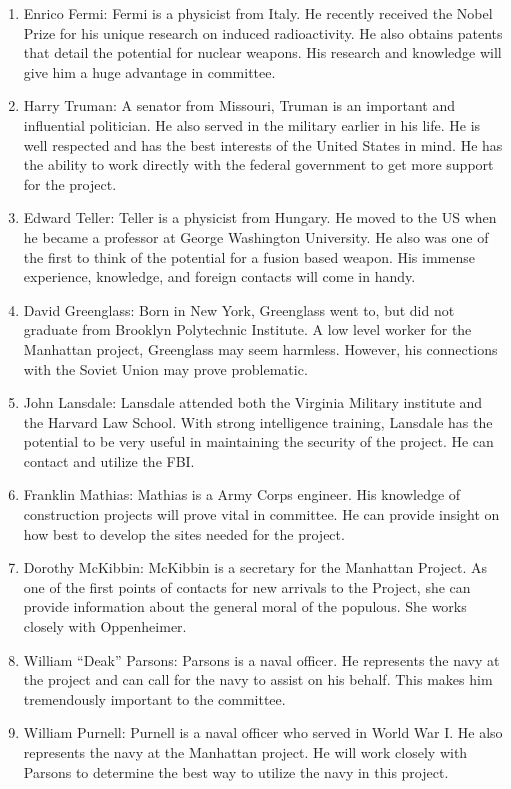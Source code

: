 \documentclass[11 pt, twoside]{article}
\begin{document}
\begin{enumerate}
\item Enrico Fermi: Fermi is a physicist from Italy. He recently received the Nobel Prize for his unique research on induced radioactivity. He also obtains patents that detail the potential for nuclear weapons. His research and knowledge will give him a huge advantage in committee.  
\item Harry Truman: A senator from Missouri, Truman is an important and influential politician. He also   served in the military earlier in his life. He is well respected and has the best interests of the United States in mind. He has the ability to work directly with the federal government to get more support for the project.
\item Edward Teller: Teller is a physicist from Hungary. He moved to the US when he became a professor at George Washington University. He also was one of the first to think of the potential for a fusion based weapon. His immense experience, knowledge, and foreign contacts will come in handy.
\item David Greenglass: Born in New York, Greenglass went to, but did not graduate from Brooklyn  Polytechnic Institute. A low level worker for the Manhattan project, Greenglass may seem harmless. However, his connections with the Soviet Union may prove problematic. 
\item John Lansdale: Lansdale attended both the Virginia Military institute and the Harvard Law School. With strong intelligence training, Lansdale has the potential to be very useful in maintaining the security of the project. He can contact and utilize the FBI.
\item Franklin Mathias: Mathias is a Army Corps engineer. His knowledge of construction projects will prove vital in committee. He can provide insight on how best to develop the sites needed for the project.
\item Dorothy McKibbin: McKibbin is a secretary for the Manhattan Project. As one of the first points of contacts for new arrivals to the Project, she can provide information about the general moral of the populous. She works closely with Oppenheimer.
\item William ``Deak'' Parsons: Parsons is a naval officer. He represents the navy at the project and can call for the navy to assist on his behalf. This makes him tremendously important to the committee.
\item William Purnell: Purnell is a naval officer who served in World War I. He also represents the navy at the Manhattan project. He will work closely with Parsons to determine the best way to utilize the navy in this project.

\end{enumerate}
\end{document}
